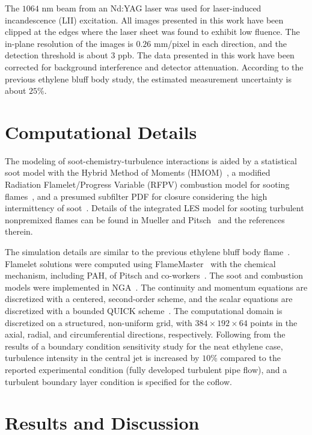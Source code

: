\documentclass{essci}
\begin{document}
The $1064$ nm beam from an Nd:YAG laser was used for laser-induced incandescence (LII) excitation.  All images presented in this work have been clipped at the edges where the laser sheet was found to exhibit low fluence.  The in-plane resolution of the images is $0.26$ mm/pixel in each direction, and the detection threshold is about $3$ ppb.  The data presented in this work have been corrected for background interference and detector attenuation.  According to the previous ethylene bluff body study, the estimated measurement uncertainty is about $25$\%.  

\section{Computational Details}

The modeling of soot-chemistry-turbulence interactions is aided by a statistical soot model with the Hybrid Method of Moments (HMOM)~\cite{mueller09b}, a modified Radiation Flamelet/Progress Variable (RFPV) combustion model for sooting flames~\cite{mueller12}, and a presumed subfilter PDF for closure considering the high intermittency of soot~\cite{mueller11b}.  Details of the integrated LES model for sooting turbulent nonpremixed flames can be found in Mueller and Pitsch~\cite{mueller12} and the references therein.

The simulation details are similar to the previous ethylene bluff body flame~\cite{mueller13}.  Flamelet solutions were computed using FlameMaster~\cite{FlameMaster} with the chemical mechanism, including PAH, of Pitsch and co-workers~\cite{blanquart09b,narayanaswamy10}.  The soot and combustion models were implemented in NGA~\cite{desjardins08}.  The continuity and momentum equations are discretized with a centered, second-order scheme, and the scalar equations are discretized with a bounded QUICK scheme~\cite{herrmann06}.  The computational domain is discretized on a structured, non-uniform grid, with $384 \times 192 \times 64$ points in the axial, radial, and circumferential directions, respectively.  Following from the results of a boundary condition sensitivity study for the neat ethylene case, turbulence intensity in the central jet is increased by $10$\% compared to the reported experimental condition (fully developed turbulent pipe flow), and a turbulent boundary layer condition is specified for the coflow. 

\section{Results and Discussion}
\end{document}
